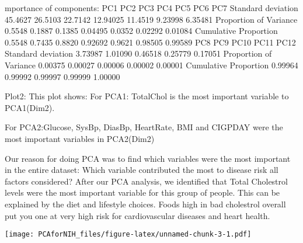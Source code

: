 \documentclass[]{article}
\newenvironment{Shaded}{\begin{snugshade}}{\end{snugshade}}
\newcommand{\KeywordTok}[1]{\textcolor[rgb]{0.13,0.29,0.53}{\textbf{#1}}}
\newcommand{\DataTypeTok}[1]{\textcolor[rgb]{0.13,0.29,0.53}{#1}}
\newcommand{\StringTok}[1]{\textcolor[rgb]{0.31,0.60,0.02}{#1}}
\newcommand{\CommentTok}[1]{\textcolor[rgb]{0.56,0.35,0.01}{\textit{#1}}}
\newcommand{\OtherTok}[1]{\textcolor[rgb]{0.56,0.35,0.01}{#1}}
\newcommand{\OperatorTok}[1]{\textcolor[rgb]{0.81,0.36,0.00}{\textbf{#1}}}
\newcommand{\NormalTok}[1]{#1}
\begin{document}
mportance of components: PC1 PC2 PC3 PC4 PC5 PC6 PC7 Standard deviation
45.4627 26.5103 22.7142 12.94025 11.4519 9.23998 6.35481 Proportion of
Variance 0.5548 0.1887 0.1385 0.04495 0.0352 0.02292 0.01084 Cumulative
Proportion 0.5548 0.7435 0.8820 0.92692 0.9621 0.98505 0.99589 PC8 PC9
PC10 PC11 PC12 Standard deviation 3.73987 1.01090 0.46518 0.25779
0.17051 Proportion of Variance 0.00375 0.00027 0.00006 0.00002 0.00001
Cumulative Proportion 0.99964 0.99992 0.99997 0.99999 1.00000

Plot2: This plot shows: For PCA1: TotalChol is the most important
variable to PCA1(Dim2).

For PCA2:Glucose, SysBp, DiasBp, HeartRate, BMI and CIGPDAY were the
most important variables in PCA2(Dim2)

Our reason for doing PCA was to find which variables were the most
important in the entire dataset: Which variable contributed the most to
disease risk all factors considered? After our PCA analysis, we
identified that Total Cholestrol levels were the most important variable
for this group of people. This can be explained by the diet and
lifestyle choices. Foods high in bad cholestrol overall put you one at
very high risk for cardiovascular diseases and heart health.

\begin{Shaded}
\end{Shaded}

\texttt{[image: PCAforNIH\_files/figure-latex/unnamed-chunk-3-1.pdf]}

\begin{Shaded}
\end{Shaded}
\end{document}
